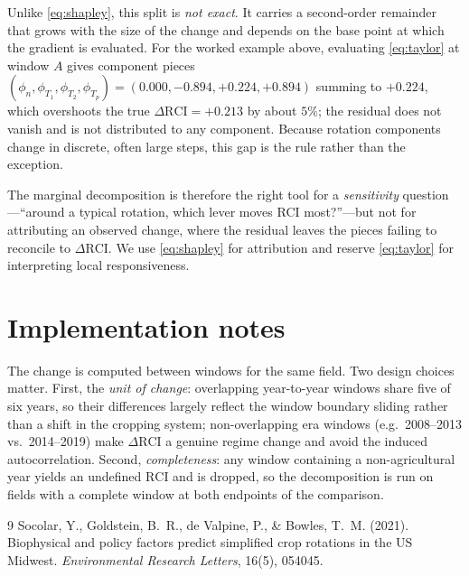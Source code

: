 \documentclass[11pt]{article}
\newcommand{\RCI}{\mathrm{RCI}}
\begin{document}
Unlike \eqref{eq:shapley}, this split is \emph{not exact}. It carries a
second-order remainder that grows with the size of the change and depends on the
base point at which the gradient is evaluated. For the worked example above,
evaluating \eqref{eq:taylor} at window $A$ gives component pieces
$(\phi_n,\phi_{T_1},\phi_{T_2},\phi_{T_p})=(0.000,-0.894,+0.224,+0.894)$
summing to $+0.224$, which overshoots the true $\Delta\RCI=+0.213$ by about
$5\%$; the residual does not vanish and is not distributed to any component.
Because rotation components change in discrete, often large steps, this gap is
the rule rather than the exception.

The marginal decomposition is therefore the right tool for a \emph{sensitivity}
question---``around a typical rotation, which lever moves RCI most?''---but not
for attributing an observed change, where the residual leaves the pieces failing
to reconcile to $\Delta\RCI$. We use \eqref{eq:shapley} for attribution and
reserve \eqref{eq:taylor} for interpreting local responsiveness.

\section{Implementation notes}

The change is computed between windows for the same field. Two design choices
matter. First, the \emph{unit of change}: overlapping year-to-year windows share
five of six years, so their differences largely reflect the window boundary
sliding rather than a shift in the cropping system; non-overlapping era windows
(e.g.\ 2008--2013 vs.\ 2014--2019) make $\Delta\RCI$ a genuine regime change and
avoid the induced autocorrelation. Second, \emph{completeness}: any window
containing a non-agricultural year yields an undefined $\RCI$ and is dropped, so
the decomposition is run on fields with a complete window at both endpoints of
the comparison.

\begin{thebibliography}{9}
Socolar, Y., Goldstein, B.~R., de Valpine, P., \& Bowles, T.~M. (2021).
Biophysical and policy factors predict simplified crop rotations in the US
Midwest. \emph{Environmental Research Letters}, 16(5), 054045.
\end{thebibliography}
\end{document}
